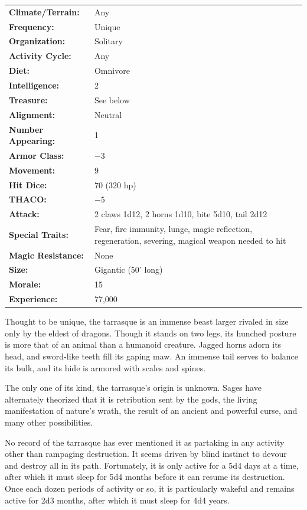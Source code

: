 \begin{multicols}{2}
\begin{minipage}{\columnwidth}
\noindent \begin{tabular}{p{}p{}}
\textbf{Climate/Terrain:}	& Any	\\
\textbf{Frequency:} 		& Unique	\\
\textbf{Organization:} 		& Solitary	\\
\textbf{Activity Cycle:} 	& Any	\\
\textbf{Diet:} 				& Omnivore	\\
\textbf{Intelligence:} 		& 2	\\
\textbf{Treasure:} 			& See below	\\
\textbf{Alignment:} 		& Neutral	\\
\hline
\textbf{Number Appearing:} 	& 1	\\
\textbf{Armor Class:} 		& $-3$	\\
\textbf{Movement:} 			& 9	\\
\textbf{Hit Dice:} 			& 70 (320 hp)	\\
\textbf{THACO:} 			& $-5$	\\
\textbf{Attack:} 			& 2 claws 1d12, 2 horns 1d10, bite 5d10, tail 2d12	\\
\textbf{Special Traits:} & Fear, fire immunity, lunge, magic reflection, regeneration, severing, magical weapon needed to hit	\\
\textbf{Magic Resistance:} 	& None	\\
\textbf{Size:} 				& Gigantic (50' long)	\\
\textbf{Morale:} 			& 15	\\
\textbf{Experience:} 		& 77,000	\\ %
\end{tabular}

\end{minipage}

Thought to be unique, the tarrasque is an immense beast larger rivaled in size only by the eldest of dragons. Though it stands on two legs, its hunched posture is more that of an animal than a humanoid creature. Jagged horns adorn its head, and sword-like teeth fill its gaping maw. An immense tail serves to balance its bulk, and its hide is armored with scales and spines.

The only one of its kind, the tarrasque's origin is unknown. Sages have alternately theorized that it is retribution sent by the gods, the living manifestation of nature's wrath, the result of an ancient and powerful curse, and many other possibilities. 

No record of the tarrasque has ever mentioned it as partaking in any activity other than rampaging destruction. It seems driven by blind instinct to devour and destroy all in its path. Fortunately, it is only active for a 5d4 days at a time, after which it must sleep for 5d4 months before it can resume its destruction. Once each dozen periods of activity or so, it is particularly wakeful and remains active for 2d3 months, after which it must sleep for 4d4 years.


\end{multicols}
